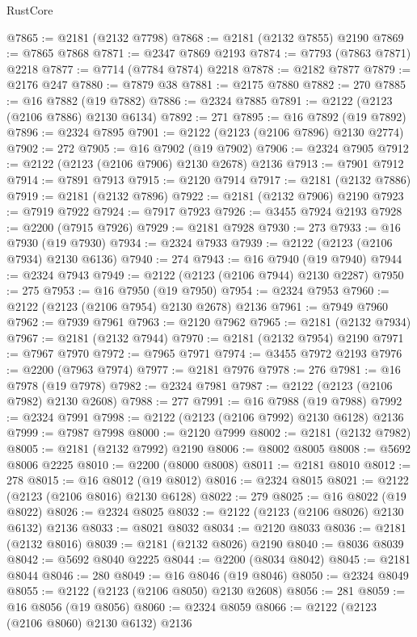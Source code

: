 \begin{lexlean}{RustCore}
\begin{coremodule}
@7865 := @2181 (@2132 @7798)
@7868 := @2181 (@2132 @7855) @2190
@7869 := @7865 @7868
@7871 := @2347 @7869 @2193
@7874 := @7793 (@7863 @7871) @2218
@7877 := @7714 (@7784 @7874) @2218
@7878 := @2182 @7877
@7879 := @2176 @247
@7880 := @7879 @38
@7881 := @2175 @7880
@7882 := 270
@7885 := @16 @7882 (@19 @7882)
@7886 := @2324 @7885
@7891 := @2122 (@2123 (@2106 @7886) @2130 @6134)
@7892 := 271
@7895 := @16 @7892 (@19 @7892)
@7896 := @2324 @7895
@7901 := @2122 (@2123 (@2106 @7896) @2130 @2774)
@7902 := 272
@7905 := @16 @7902 (@19 @7902)
@7906 := @2324 @7905
@7912 := @2122 (@2123 (@2106 @7906) @2130 @2678) @2136
@7913 := @7901 @7912
@7914 := @7891 @7913
@7915 := @2120 @7914
@7917 := @2181 (@2132 @7886)
@7919 := @2181 (@2132 @7896)
@7922 := @2181 (@2132 @7906) @2190
@7923 := @7919 @7922
@7924 := @7917 @7923
@7926 := @3455 @7924 @2193
@7928 := @2200 (@7915 @7926)
@7929 := @2181 @7928
@7930 := 273
@7933 := @16 @7930 (@19 @7930)
@7934 := @2324 @7933
@7939 := @2122 (@2123 (@2106 @7934) @2130 @6136)
@7940 := 274
@7943 := @16 @7940 (@19 @7940)
@7944 := @2324 @7943
@7949 := @2122 (@2123 (@2106 @7944) @2130 @2287)
@7950 := 275
@7953 := @16 @7950 (@19 @7950)
@7954 := @2324 @7953
@7960 := @2122 (@2123 (@2106 @7954) @2130 @2678) @2136
@7961 := @7949 @7960
@7962 := @7939 @7961
@7963 := @2120 @7962
@7965 := @2181 (@2132 @7934)
@7967 := @2181 (@2132 @7944)
@7970 := @2181 (@2132 @7954) @2190
@7971 := @7967 @7970
@7972 := @7965 @7971
@7974 := @3455 @7972 @2193
@7976 := @2200 (@7963 @7974)
@7977 := @2181 @7976
@7978 := 276
@7981 := @16 @7978 (@19 @7978)
@7982 := @2324 @7981
@7987 := @2122 (@2123 (@2106 @7982) @2130 @2608)
@7988 := 277
@7991 := @16 @7988 (@19 @7988)
@7992 := @2324 @7991
@7998 := @2122 (@2123 (@2106 @7992) @2130 @6128) @2136
@7999 := @7987 @7998
@8000 := @2120 @7999
@8002 := @2181 (@2132 @7982)
@8005 := @2181 (@2132 @7992) @2190
@8006 := @8002 @8005
@8008 := @5692 @8006 @2225
@8010 := @2200 (@8000 @8008)
@8011 := @2181 @8010
@8012 := 278
@8015 := @16 @8012 (@19 @8012)
@8016 := @2324 @8015
@8021 := @2122 (@2123 (@2106 @8016) @2130 @6128)
@8022 := 279
@8025 := @16 @8022 (@19 @8022)
@8026 := @2324 @8025
@8032 := @2122 (@2123 (@2106 @8026) @2130 @6132) @2136
@8033 := @8021 @8032
@8034 := @2120 @8033
@8036 := @2181 (@2132 @8016)
@8039 := @2181 (@2132 @8026) @2190
@8040 := @8036 @8039
@8042 := @5692 @8040 @2225
@8044 := @2200 (@8034 @8042)
@8045 := @2181 @8044
@8046 := 280
@8049 := @16 @8046 (@19 @8046)
@8050 := @2324 @8049
@8055 := @2122 (@2123 (@2106 @8050) @2130 @2608)
@8056 := 281
@8059 := @16 @8056 (@19 @8056)
@8060 := @2324 @8059
@8066 := @2122 (@2123 (@2106 @8060) @2130 @6132) @2136

\end{coremodule}
\end{lexlean}
